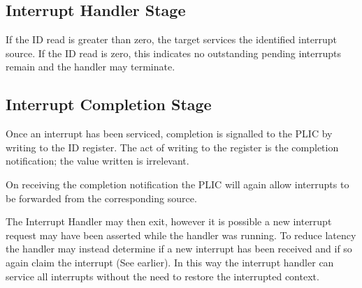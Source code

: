 \subsection{Interrupt Handler Stage}

If the ID read is greater than zero, the target services the identified interrupt source.
If the ID read is zero, this indicates no outstanding pending interrupts remain and the handler may terminate.

\subsection{Interrupt Completion Stage}

Once an interrupt has been serviced, completion is signalled to the PLIC by writing to the ID register.
The act of writing to the register is the completion notification; the value written is irrelevant.

On receiving the completion notification the PLIC will again allow interrupts to be forwarded from the corresponding source.

The Interrupt Handler may then exit, however it is possible a new
interrupt request may have been asserted while the handler was running.
To reduce latency the handler may instead determine if a new interrupt
has been received and if so again claim the interrupt (See earlier). In this
way the interrupt handler can service all interrupts without the need to
restore the interrupted context.
